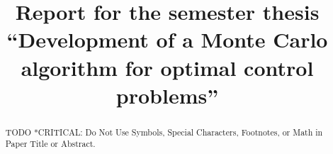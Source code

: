 \documentclass[conference]{IEEEtran}
\begin{document}
\title{Report for the semester thesis ``Development of a Monte Carlo algorithm for optimal control problems''}

\author{
}

\maketitle

\begin{abstract}
TODO *CRITICAL: Do Not Use Symbols, Special Characters, Footnotes, 
or Math in Paper Title or Abstract.
\end{abstract}
\end{document}
